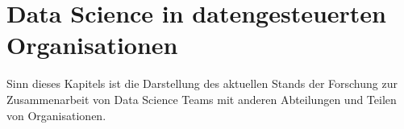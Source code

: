 \chapter{Data Science in datengesteuerten Organisationen}

Sinn dieses Kapitels ist die Darstellung des aktuellen Stands der Forschung zur Zusammenarbeit von Data Science Teams mit anderen Abteilungen und Teilen von Organisationen.